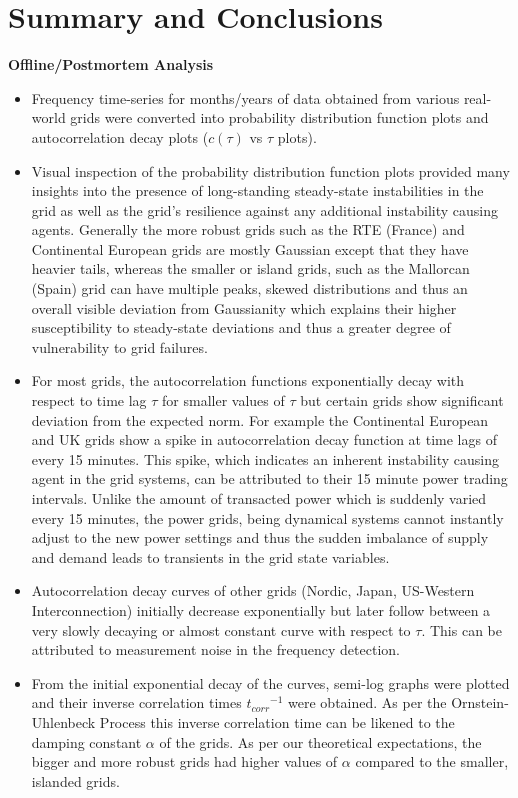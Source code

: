 \section[Conclusions]{Summary and Conclusions}
\label{sec:concl}

\noindent\textbf{Offline/Postmortem Analysis}
\begin{itemize}
	\item Frequency time-series for months/years of data obtained from various real-world grids were converted into probability distribution function plots and autocorrelation decay plots ($c(\tau)$ vs $\tau$ plots).
	\item Visual inspection of the probability distribution function plots provided many insights into the presence of long-standing steady-state instabilities in the grid as well as the grid's resilience against any additional instability causing agents. Generally the more robust grids such as the RTE (France) and Continental European grids are mostly Gaussian except that they have heavier tails, whereas the smaller or island grids, such as the Mallorcan (Spain) grid can have multiple peaks, skewed distributions and thus an overall visible deviation from Gaussianity which explains their higher susceptibility to steady-state deviations and thus a greater degree of vulnerability to grid failures. 
	\item For most grids, the autocorrelation functions exponentially decay with respect to time lag $\tau$ for smaller values of $\tau$ but certain grids show significant deviation from the expected norm. For example the Continental European and UK grids show a spike in autocorrelation decay function at time lags of every 15 minutes. This spike, which indicates an inherent instability causing agent in the grid systems, can be attributed to their 15 minute power trading intervals. Unlike the amount of transacted power which is suddenly varied every 15 minutes, the power grids, being dynamical systems cannot instantly adjust to the new power settings and thus the sudden imbalance of supply and demand leads to transients in the grid state variables.
	\item Autocorrelation decay curves of other grids (Nordic, Japan, US-Western Interconnection) initially decrease exponentially but later follow between a very slowly decaying or almost constant curve with respect to $\tau$. This can be attributed to measurement noise in the frequency detection.
	\item From the initial exponential decay of the curves, semi-log graphs were plotted and their inverse correlation times ${t_{corr}}^{-1}$ were obtained. As per the Ornstein-Uhlenbeck Process this inverse correlation time can be likened to the damping constant $\alpha$ of the grids. As per our theoretical expectations, the bigger and more robust grids had higher values of $\alpha$ compared to the smaller, islanded grids.
\end{itemize}

